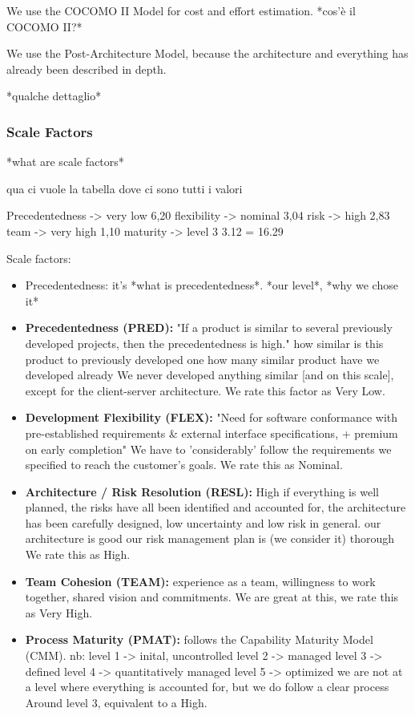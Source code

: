 \documentclass[english]{article}
\begin{document}
We use the COCOMO II Model for cost and effort estimation.
*cos'è il COCOMO II?*

We use the Post-Architecture Model, because the architecture and everything has already been described in depth.

*qualche dettaglio*

\subsubsection{Scale Factors}

*what are scale factors*

qua ci vuole la tabella dove ci sono tutti i valori

Precedentedness -> very low 6,20
flexibility -> nominal 3,04
risk -> high 2,83
team -> very high 1,10
maturity -> level 3 3.12 
= 16.29


Scale factors:
\begin{itemize}
	\item Precedentedness: it's *what is precedentedness*. *our level*, *why we chose it*
	\item \textbf{Precedentedness (PRED):} "If a product is similar to several previously developed projects, then the precedentedness is high."
	how similar is this product to previously developed one
	how many similar product have we developed already
	We never developed anything similar [and on this scale], except for the client-server architecture. We rate this factor as Very Low.
	\item \textbf{Development Flexibility (FLEX):} "Need for software conformance with pre-established requirements \& external interface specifications, + premium on early completion"
	We have to 'considerably' follow the requirements we specified to reach the customer's goals. We rate this as Nominal.
	\item \textbf{Architecture / Risk Resolution (RESL):} High if everything is well planned, the risks have all been identified and accounted for, the architecture has been carefully designed, low uncertainty and low risk in general.
	our architecture is good
	our risk management plan is (we consider it) thorough
	We rate this as High.
	\item \textbf{Team Cohesion (TEAM):} experience as a team, willingness to work together, shared vision and commitments.
	We are great at this, we rate this as Very High.
	\item \textbf{Process Maturity (PMAT):} follows the Capability Maturity Model (CMM).
	nb:
	level 1 -> inital, uncontrolled
	level 2 -> managed
	level 3 -> defined
	level 4 -> quantitatively managed
	level 5 -> optimized
	we are not at a level where everything is accounted for, but we do follow a clear process
	Around level 3, equivalent to a High.
\end{itemize}
\end{document}
